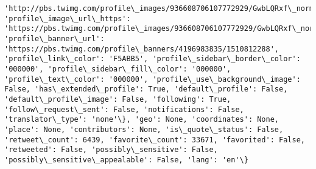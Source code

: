 \documentclass[11pt]{article}
\begin{document}
\begin{Verbatim}[commandchars=\\\{\}]
'http://pbs.twimg.com/profile\_images/936608706107772929/GwbLQRxf\_normal.jpg', 'profile\_image\_url\_https': 'https://pbs.twimg.com/profile\_images/936608706107772929/GwbLQRxf\_normal.jpg', 'profile\_banner\_url': 'https://pbs.twimg.com/profile\_banners/4196983835/1510812288', 'profile\_link\_color': 'F5ABB5', 'profile\_sidebar\_border\_color': '000000', 'profile\_sidebar\_fill\_color': '000000', 'profile\_text\_color': '000000', 'profile\_use\_background\_image': False, 'has\_extended\_profile': True, 'default\_profile': False, 'default\_profile\_image': False, 'following': True, 'follow\_request\_sent': False, 'notifications': False, 'translator\_type': 'none'\}, 'geo': None, 'coordinates': None, 'place': None, 'contributors': None, 'is\_quote\_status': False, 'retweet\_count': 6439, 'favorite\_count': 33671, 'favorited': False, 'retweeted': False, 'possibly\_sensitive': False, 'possibly\_sensitive\_appealable': False, 'lang': 'en'\}

\end{Verbatim}
\end{document}

